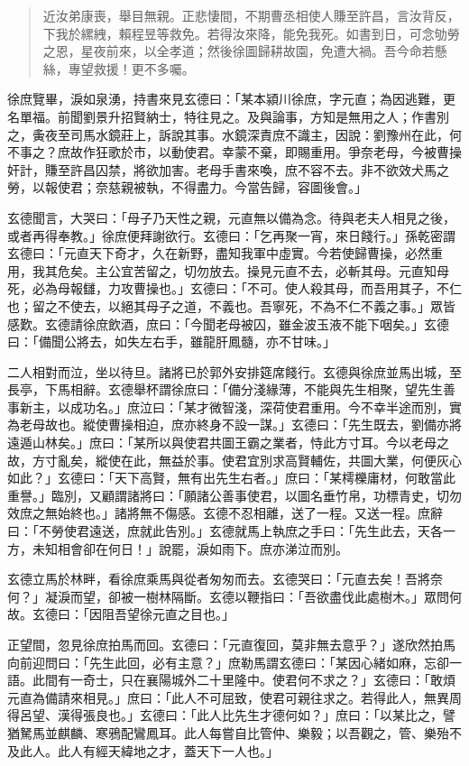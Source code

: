 \begin{quote}
近汝弟康喪，舉目無親。正悲悽間，不期曹丞相使人賺至許昌，言汝背反，下我於縲絏，賴程昱等救免。若得汝來降，能免我死。如書到日，可念劬勞之恩，星夜前來，以全孝道；然後徐圖歸耕故園，免遭大禍。吾今命若懸絲，專望救援！更不多囑。
\end{quote}

徐庶覽畢，淚如泉湧，持書來見玄德曰：「某本潁川徐庶，字元直；為因逃難，更名單福。前聞劉景升招賢納士，特往見之。及與論事，方知是無用之人；作書別之，夤夜至司馬水鏡莊上，訴說其事。水鏡深責庶不識主，因說：劉豫州在此，何不事之？庶故作狂歌於市，以動使君。幸蒙不棄，即賜重用。爭奈老母，今被曹操奸計，賺至許昌囚禁，將欲加害。老母手書來喚，庶不容不去。非不欲效犬馬之勞，以報使君；奈慈親被執，不得盡力。今當告歸，容圖後會。」

玄德聞言，大哭曰：「母子乃天性之親，元直無以備為念。待與老夫人相見之後，或者再得奉教。」徐庶便拜謝欲行。玄德曰：「乞再聚一宵，來日餞行。」孫乾密謂玄德曰：「元直天下奇才，久在新野，盡知我軍中虛實。今若使歸曹操，必然重用，我其危矣。主公宜苦留之，切勿放去。操見元直不去，必斬其母。元直知母死，必為母報讎，力攻曹操也。」玄德曰：「不可。使人殺其母，而吾用其子，不仁也；留之不使去，以絕其母子之道，不義也。吾寧死，不為不仁不義之事。」眾皆感歎。玄德請徐庶飲酒，庶曰：「今聞老母被囚，雖金波玉液不能下咽矣。」玄德曰：「備聞公將去，如失左右手，雖龍肝鳳髓，亦不甘味。」

二人相對而泣，坐以待旦。諸將已於郭外安排筵席餞行。玄德與徐庶並馬出城，至長亭，下馬相辭。玄德舉杯謂徐庶曰：「備分淺緣薄，不能與先生相聚，望先生善事新主，以成功名。」庶泣曰：「某才微智淺，深荷使君重用。今不幸半途而別，實為老母故也。縱使曹操相迫，庶亦終身不設一謀。」玄德曰：「先生既去，劉備亦將遠遁山林矣。」庶曰：「某所以與使君共圖王霸之業者，恃此方寸耳。今以老母之故，方寸亂矣，縱使在此，無益於事。使君宜別求高賢輔佐，共圖大業，何便灰心如此？」玄德曰：「天下高賢，無有出先生右者。」庶曰：「某樗櫟庸材，何敢當此重譽。」臨別，又顧謂諸將曰：「願諸公善事使君，以圖名垂竹帛，功標青史，切勿效庶之無始終也。」諸將無不傷感。玄德不忍相離，送了一程。又送一程。庶辭曰：「不勞使君遠送，庶就此告別。」玄德就馬上執庶之手曰：「先生此去，天各一方，未知相會卻在何日！」說罷，淚如雨下。庶亦涕泣而別。

玄德立馬於林畔，看徐庶乘馬與從者匆匆而去。玄德哭曰：「元直去矣！吾將奈何？」凝淚而望，卻被一樹林隔斷。玄德以鞭指曰：「吾欲盡伐此處樹木。」眾問何故。玄德曰：「因阻吾望徐元直之目也。」

正望間，忽見徐庶拍馬而回。玄德曰：「元直復回，莫非無去意乎？」遂欣然拍馬向前迎問曰：「先生此回，必有主意？」庶勒馬謂玄德曰：「某因心緒如麻，忘卻一語。此間有一奇士，只在襄陽城外二十里隆中。使君何不求之？」玄德曰：「敢煩元直為備請來相見。」庶曰：「此人不可屈致，使君可親往求之。若得此人，無異周得呂望、漢得張良也。」玄德曰：「此人比先生才德何如？」庶曰：「以某比之，譬猶駑馬並麒麟、寒鴉配鸞鳳耳。此人每嘗自比管仲、樂毅；以吾觀之，管、樂殆不及此人。此人有經天緯地之才，蓋天下一人也。」


